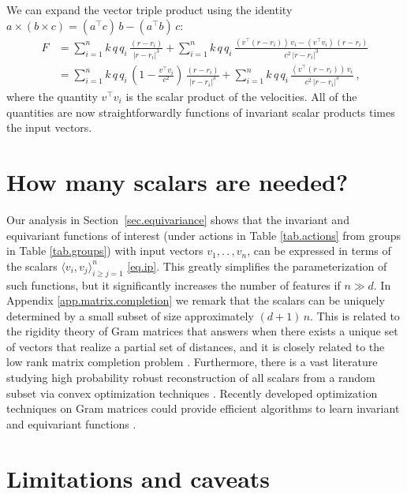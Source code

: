 \documentclass{article}
\theoremstyle{Hogg}
\newcommand{\inner}[2]{\langle{#1},{#2}\rangle}
\renewcommand{\ldots}{.\,.\,}
\begin{document}
We can expand the vector triple product using the identity $a \times (b \times c) = (a^\top c)\,b - (a^\top b)\,c$:
\begin{align}
    F &= \sum_{i=1}^n k\,q\,q_i\,\frac{(r - r_i)}{|r - r_i|^3} + \sum_{i=1}^n k\,q\,q_i\,\frac{(v^\top (r - r_i))\,v_i - (v^\top v_i)\,(r - r_i)}{c^2\,|r - r_i|^3} \nonumber \\
    &= \sum_{i=1}^n k\,q\,q_i\,\left( 1 - \frac{v^\top v_i}{c^2} \right)\,\frac{(r - r_i)}{|r - r_i|^3} + \sum_{i=1}^n k\,q\,q_i\,\frac{(v^\top (r - r_i))\,v_i}{c^2\,|r - r_i|^3} 
    ~,\label{eq.elec_force}
\end{align}
where the quantity $v^\top v_i$ is the scalar product of the velocities.
All of the quantities are now straightforwardly functions of invariant scalar products times the input vectors.



\section{How many scalars are needed?}
\label{sec.howmany}
Our analysis in Section~\ref{sec.equivariance} shows that the invariant and equivariant functions of interest (under actions in Table \ref{tab.actions} from groups in Table \ref{tab.groups}) with input vectors $v_1,\ldots, v_n$, can be expressed in terms of the scalars $\inner{v_i}{v_j}_{i\geq j=1}^n$ \eqref{eq.ip}. This greatly simplifies the parameterization of such functions, but it significantly increases the number of features if $n\gg d$. 
In Appendix \ref{app.matrix.completion} we remark that the scalars can be uniquely determined by a small subset of size approximately $(d+1)\, n$. This is related to the rigidity theory of Gram matrices \cite{roth1981rigid} that answers when there exists a unique set of vectors that realize a partial set of distances, and it is closely related to the low rank matrix completion problem \cite{singer2010uniqueness}. Furthermore, there is a vast literature studying high probability robust reconstruction of all scalars from a random subset 
via convex optimization techniques \cite{candes2008exact}. Recently developed optimization techniques on Gram matrices could provide efficient algorithms to learn invariant and equivariant functions \cite{jalali2017variational}.

\section{Limitations and caveats} \label{sec.limitations}
\end{document}
